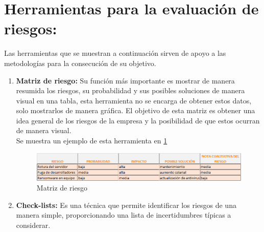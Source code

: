 \section{Herramientas  para la evaluación de riesgos:}
Las herramientas que se muestran a continuación sirven de apoyo a las metodologías para la consecución de su objetivo.
\begin{enumerate}

\item {\bfseries Matriz de riesgo:}
Su función más importante es mostrar de manera resumida los riesgos, su probabilidad  y sus posibles soluciones de manera visual en una tabla, esta herramienta no se encarga de obtener estos datos, solo mostrarlos de manera gráfica.
El objetivo de esta matriz es obtener una idea general de los riesgos de la empresa y la posibilidad de que estos ocurran de manera visual.\\
Se muestra un ejemplo de esta herramienta en \ref{img:matriz_riesgo}
\begin{figure}[tphb]
  		   \centering
     		   \includegraphics[width=7in]{matriz_de_riesgo.png}
  		   \caption{Matriz de riesgo}
  		   \label{img:matriz_riesgo}
\end{figure}
\item {\bfseries Check-lists:}
Es una técnica que permite identificar los riesgos de una manera simple, proporcionando una lista de incertidumbres típicas a considerar.


\end{enumerate}
